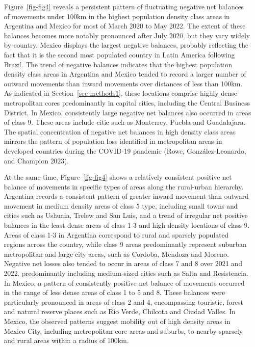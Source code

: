 \documentclass[
  11pt,
]{article}
\begin{document}
Figure~\ref{fig-fig4} reveals a persistent pattern of fluctuating
negative net balances of movements under 100km in the highest population
density class areas in Argentina and Mexico for most of March 2020 to
May 2022. The extent of these balances becomes more notably pronounced
after July 2020, but they vary widely by country. Mexico displays the
largest negative balances, probably reflecting the fact that it is the
second most populated country in Latin America following Brazil. The
trend of negative balances indicates that the highest population density
class areas in Argentina and Mexico tended to record a larger number of
outward movements than inward movements over distances of less than
100km. As indicated in Section~\ref{sec-methods1}, these locations
comprise highly dense metropolitan cores predominantly in capital
cities, including the Central Business District. In Mexico, consistently
large negative net balances also occurred in areas of class 9. These
areas include citie such as Monterrey, Puebla and Guadalajara. The
spatial concentration of negative net balances in high density class
areas mirrors the pattern of population loss identified in metropolitan
areas in developed countries during the COVID-19 pandemic (Rowe,
González-Leonardo, and Champion 2023).

At the same time, Figure~\ref{fig-fig4} shows a relatively consistent
positive net balance of movements in specific types of areas along the
rural-urban hierarchy. Argentina records a consistent pattern of greater
inward movement than outward movement in medium density areas of class 5
type, including small towns and cities such as Ushuaia, Trelew and San
Luis, and a trend of irregular net positive balances in the least dense
areas of class 1-3 and high density locations of class 9. Areas of class
1-3 in Argentina correspond to rural and sparsely populated regions
across the country, while class 9 areas predominantly represent suburban
metropolitan and large city areas, such as Cordoba, Mendoza and Moreno.
Negative net losses also tended to occur in areas of class 7 and 8 over
2021 and 2022, predominantly including medium-sized cities such as Salta
and Resistencia. In Mexico, a pattern of consistently positive net
balance of movements occurred in the range of less dense areas of class
1 to 5 and 8. These balances were particularly pronounced in areas of
class 2 and 4, encompassing touristic, forest and natural reserve places
such as Rio Verde, Chilcota and Ciudad Valles. In Mexico, the observed
patterns suggest mobility out of high density areas in Mexico City,
including metropolitan core areas and suburbs, to nearby sparsely and
rural areas within a radius of 100km.
\end{document}
